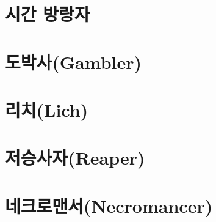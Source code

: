 \documentclass{report}
\begin{document}
	\section{시간 방랑자}
		
		
	\section{도박사(Gambler)}
		
	
	\section{리치(Lich)}
		
	
	\section{저승사자(Reaper)}
		
	
	\section{네크로맨서(Necromancer)}
		
\end{document}
